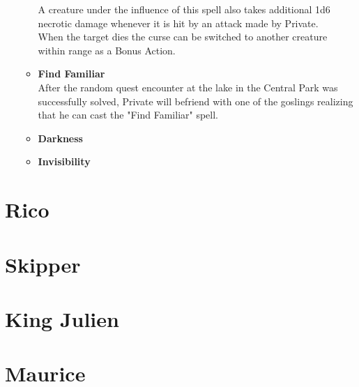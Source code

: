 \begin{itemize}
\begin{itemize}
		A creature under the influence of this spell also takes additional 1d6 necrotic damage whenever it is hit by an attack made by Private.\\
		When the target dies the curse can be switched to another creature within range as a Bonus Action.
		\item \textcolor{titlered}{\textbf{Find Familiar}}\\
		After the random quest encounter at the lake in the Central Park was successfully solved, Private will befriend with one of the goslings realizing that he can cast the "Find Familiar" spell.
		\item \textcolor{titlered}{\textbf{Darkness}}\\
		\item \textcolor{titlered}{\textbf{Invisibility}}\\
	\end{itemize}
\end{itemize}
\clearpage
\section*{Rico}
\clearpage
\section*{Skipper}
\clearpage
\section*{King Julien}
\clearpage
\section*{Maurice}
